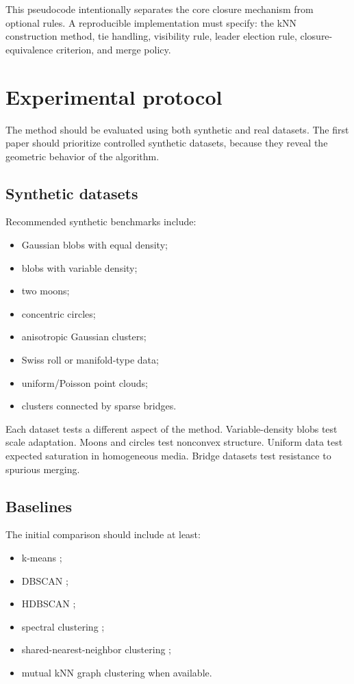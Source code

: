 \documentclass[11pt,a4paper]{article}
\begin{document}
This pseudocode intentionally separates the core closure mechanism from optional rules. A reproducible implementation must specify: the kNN construction method, tie handling, visibility rule, leader election rule, closure-equivalence criterion, and merge policy.

\section{Experimental protocol}
\label{sec:protocol}

The method should be evaluated using both synthetic and real datasets. The first paper should prioritize controlled synthetic datasets, because they reveal the geometric behavior of the algorithm.

\subsection{Synthetic datasets}

Recommended synthetic benchmarks include:
\begin{itemize}
    \item Gaussian blobs with equal density;
    \item blobs with variable density;
    \item two moons;
    \item concentric circles;
    \item anisotropic Gaussian clusters;
    \item Swiss roll or manifold-type data;
    \item uniform/Poisson point clouds;
    \item clusters connected by sparse bridges.
\end{itemize}

Each dataset tests a different aspect of the method. Variable-density blobs test scale adaptation. Moons and circles test nonconvex structure. Uniform data test expected saturation in homogeneous media. Bridge datasets test resistance to spurious merging.

\subsection{Baselines}

The initial comparison should include at least:
\begin{itemize}
    \item k-means \citep{MacQueen1967,Lloyd1982};
    \item DBSCAN \citep{EsterKriegelSanderXu1996};
    \item HDBSCAN \citep{CampelloMoulaviSander2013,CampelloMoulaviZimekSander2015};
    \item spectral clustering \citep{NgJordanWeiss2002,VonLuxburg2007};
    \item shared-nearest-neighbor clustering \citep{JarvisPatrick1973,ErtozSteinbachKumar2003};
    \item mutual kNN graph clustering when available.
\end{itemize}
\end{document}
